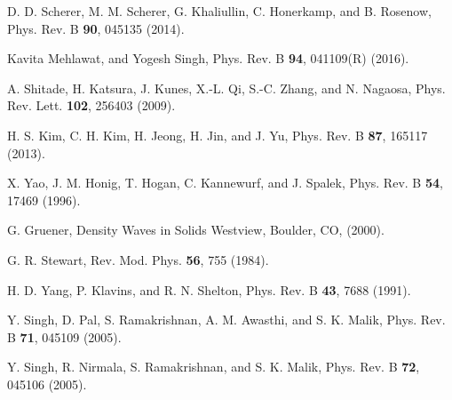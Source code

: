 \documentclass[aps,prb,twocolumn]{revtex4-1}
\begin{document}
\begin{references}
 D. D. Scherer, M. M. Scherer, G. Khaliullin, C. Honerkamp, and B. Rosenow, Phys. Rev. B { \bf 90}, 045135 (2014).

 Kavita Mehlawat, and Yogesh Singh, Phys. Rev. B {\bf 94}, 041109(R) (2016).

 A. Shitade, H. Katsura, J. Kunes, X.-L. Qi, S.-C. Zhang, and N. Nagaosa, Phys. Rev. Lett. {\bf 102}, 256403 (2009).

 H. S. Kim, C. H. Kim, H. Jeong, H. Jin, and J. Yu, Phys. Rev. B { \bf 87}, 165117 (2013).

 X. Yao, J. M. Honig, T. Hogan, C. Kannewurf, and J. Spalek, Phys. Rev. B {\bf 54}, 17469 (1996).

 G. Gruener, Density Waves in Solids Westview, Boulder, CO, (2000).

 G. R. Stewart, Rev. Mod. Phys. {\bf 56}, 755 (1984). 

 H. D. Yang, P. Klavins, and R. N. Shelton, Phys. Rev. B  {\bf 43}, 7688
(1991).

 Y. Singh, D. Pal, S. Ramakrishnan, A. M. Awasthi, and S. K. Malik, Phys. Rev. B {\bf 71}, 045109 (2005).

 Y. Singh, R. Nirmala, S. Ramakrishnan, and S. K. Malik, Phys. Rev. B {\bf 72}, 045106 (2005).


\end{references}
\end{document}
